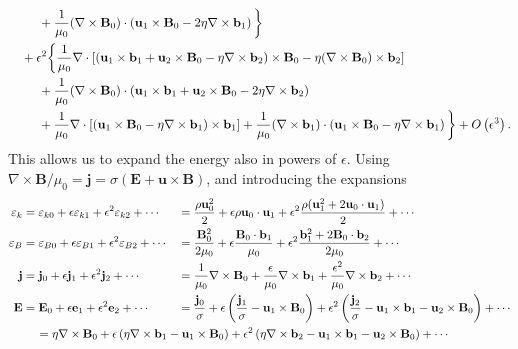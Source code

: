 \begin{equation}
\begin{aligned}
    &\quad \mkern 25mu + \frac{1}{\mu_0}(\nabla\times \mathbf{B}_0)\cdot \left(\mathbf{u}_1\times \mathbf{B}_0 - 2\eta \nabla\times \mathbf{b}_1\right)\bigg\} \\
    &\quad + \epsilon^2 \bigg\{ \frac{1}{\mu_0}\nabla\cdot \left[(\mathbf{u}_1\times \mathbf{b}_1 + \mathbf{u}_2\times \mathbf{B}_0 - \eta \nabla\times \mathbf{b}_2)\times \mathbf{B}_0 - \eta (\nabla\times \mathbf{B}_0)\times \mathbf{b}_2 \right] \\
    &\quad\mkern 25mu + \frac{1}{\mu_0}(\nabla\times \mathbf{B}_0)\cdot \left(\mathbf{u}_1\times \mathbf{b}_1 + \mathbf{u}_2\times \mathbf{B}_0 - 2\eta \nabla\times \mathbf{b}_2\right) \\
    &\quad\mkern 25mu + \frac{1}{\mu_0}\nabla\cdot \left[(\mathbf{u}_1\times \mathbf{B}_0 - \eta \nabla\times \mathbf{b}_1)\times \mathbf{b}_1\right] + \frac{1}{\mu_0}(\nabla\times \mathbf{b}_1)\cdot \left(\mathbf{u}_1\times \mathbf{B}_0 - \eta \nabla\times \mathbf{b}_1\right)\bigg\} + O\left(\epsilon^3\right).
\end{aligned}
\end{equation}
%
This allows us to expand the energy also in powers of $\epsilon$. Using $\nabla\times \mathbf{B}/\mu_0 = \mathbf{j} = \sigma (\mathbf{E} + \mathbf{u}\times \mathbf{B})$, and introducing the expansions
%
\[\begin{aligned}
    \varepsilon_k &= \varepsilon_{k0} + \epsilon \varepsilon_{k1} + \epsilon^2 \varepsilon_{k2} + \cdots 
    &&= \frac{\rho \mathbf{u}_0^2}{2} + \epsilon \rho \mathbf{u}_0\cdot \mathbf{u}_1 + \epsilon^2 \frac{\rho (\mathbf{u}_1^2 + 2 \mathbf{u}_0\cdot \mathbf{u}_1)}{2} + \cdots \\
    \varepsilon_B &= \varepsilon_{B0} + \epsilon \varepsilon_{B1} + \epsilon^2 \varepsilon_{B2} + \cdots
    &&= \frac{\mathbf{B}_0^2}{2\mu_0} + \epsilon \frac{\mathbf{B}_0\cdot \mathbf{b}_1}{\mu_0} + \epsilon^2 \frac{\mathbf{b}_1^2 + 2\mathbf{B}_0\cdot \mathbf{b}_2}{2\mu_0} + \cdots \\
    \mathbf{j} &= \mathbf{j}_0 + \epsilon\mathbf{j}_1 + \epsilon^2 \mathbf{j}_2 + \cdots 
    &&= \frac{1}{\mu_0}\nabla\times \mathbf{B}_0 + \frac{\epsilon}{\mu_0}\nabla\times \mathbf{b}_1 + \frac{\epsilon^2}{\mu_0}\nabla\times \mathbf{b}_2 + \cdots \\
    \mathbf{E} &= \mathbf{E}_0 + \epsilon \mathbf{e}_1 + \epsilon^2 \mathbf{e}_2 + \cdots 
    &&= \frac{\mathbf{j}_0}{\sigma} + \epsilon \left(\frac{\mathbf{j}_1}{\sigma} - \mathbf{u}_1\times \mathbf{B}_0\right) + \epsilon^2 \left(\frac{\mathbf{j}_2}{\sigma} - \mathbf{u}_1\times \mathbf{b}_1  - \mathbf{u}_2\times \mathbf{B}_0\right) + \cdots \\ 
    && &\mkern-215mu = \eta \nabla\times \mathbf{B}_0 + \epsilon \left(\eta \nabla\times \mathbf{b}_1 - \mathbf{u}_1\times \mathbf{B}_0\right) + \epsilon^2 \left(\eta \nabla\times \mathbf{b}_2 - \mathbf{u}_1\times \mathbf{b}_1  - \mathbf{u}_2\times \mathbf{B}_0\right) + \cdots \\ 
\end{aligned}\]
